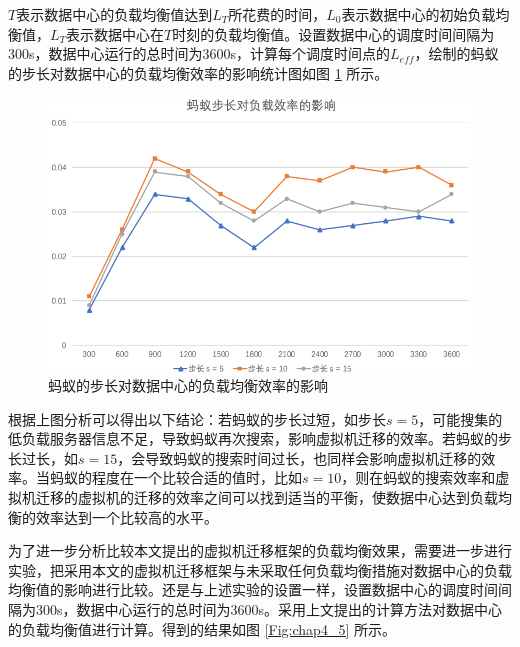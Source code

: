 $ T $表示数据中心的负载均衡值达到$ L_T $所花费的时间，$ L_0 $表示数据中心的初始负载均衡值，$ L_T $表示数据中心在$ T $时刻的负载均衡值。设置数据中心的调度时间间隔为300s，数据中心运行的总时间为3600s，计算每个调度时间点的$ L_{eff} $，绘制的蚂蚁的步长对数据中心的负载均衡效率的影响统计图如图 \ref{Fig:chap4_4} 所示。

\begin{figure}[htb]
  \centering
  \includegraphics{./Figure/IMG_Chap4_7.png}
  \caption{蚂蚁的步长对数据中心的负载均衡效率的影响}\label{Fig:chap4_4}
\end{figure}

根据上图分析可以得出以下结论：若蚂蚁的步长过短，如步长$ s = 5 $，可能搜集的低负载服务器信息不足，导致蚂蚁再次搜索，影响虚拟机迁移的效率。若蚂蚁的步长过长，如$ s = 15 $，会导致蚂蚁的搜索时间过长，也同样会影响虚拟机迁移的效率。当蚂蚁的程度在一个比较合适的值时，比如$ s = 10 $，则在蚂蚁的搜索效率和虚拟机迁移的虚拟机的迁移的效率之间可以找到适当的平衡，使数据中心达到负载均衡的效率达到一个比较高的水平。

为了进一步分析比较本文提出的虚拟机迁移框架的负载均衡效果，需要进一步进行实验，把采用本文的虚拟机迁移框架与未采取任何负载均衡措施对数据中心的负载均衡值的影响进行比较。还是与上述实验的设置一样，设置数据中心的调度时间间隔为300s，数据中心运行的总时间为3600s。采用上文提出的计算方法对数据中心的负载均衡值进行计算。得到的结果如图 \ref{Fig:chap4_5} 所示。

